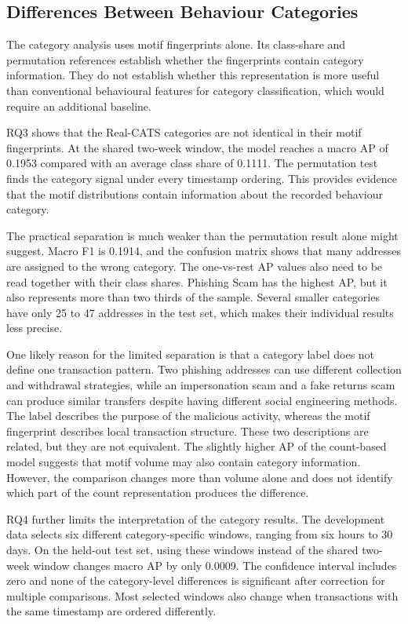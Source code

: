 \documentclass{thesisclass}
\begin{document}
\subsection{Differences Between Behaviour Categories}

The category analysis uses motif fingerprints alone. Its class-share and
permutation references establish whether the fingerprints contain category
information. They do not establish whether this representation is more useful
than conventional behavioural features for category classification, which would
require an additional baseline.

RQ3 shows that the Real-CATS categories are not identical in their motif
fingerprints. At the shared two-week window, the model reaches a macro AP of
0.1953 compared with an average class share of 0.1111. The permutation test
finds the category signal under every timestamp ordering. This provides evidence
that the motif distributions contain information about the recorded behaviour
category.

The practical separation is much weaker than the permutation result alone might
suggest. Macro F1 is 0.1914, and the confusion matrix shows that many addresses
are assigned to the wrong category. The one-vs-rest AP values also need to be
read together with their class shares. Phishing Scam has the highest AP, but it
also represents more than two thirds of the sample. Several smaller categories
have only 25 to 47 addresses in the test set, which makes their individual
results less precise.

One likely reason for the limited separation is that a category label does not
define one transaction pattern. Two phishing addresses can use different
collection and withdrawal strategies, while an impersonation scam and a fake
returns scam can produce similar transfers despite having different social
engineering methods. The label describes the purpose of the malicious activity,
whereas the motif fingerprint describes local transaction structure. These two
descriptions are related, but they are not equivalent. The slightly higher AP of
the count-based model suggests that motif volume may also contain category
information. However, the comparison changes more than volume alone and does not
identify which part of the count representation produces the difference.

RQ4 further limits the interpretation of the category results. The development
data selects six different category-specific windows, ranging from six hours to
30 days. On the held-out test set, using these windows instead of the shared
two-week window changes macro AP by only 0.0009. The confidence interval includes
zero and none of the category-level differences is significant after correction
for multiple comparisons. Most selected windows also change when transactions
with the same timestamp are ordered differently.
\end{document}
